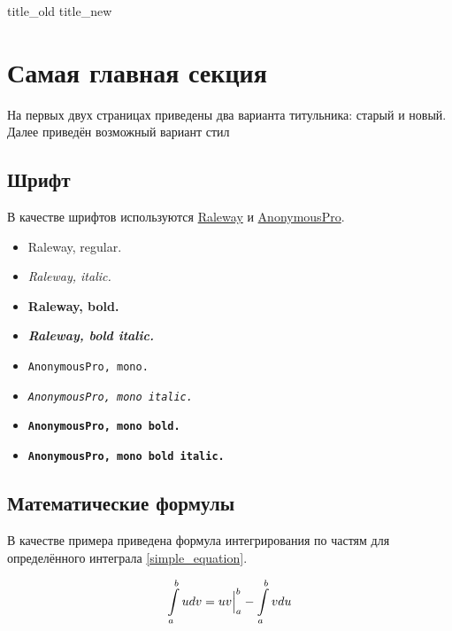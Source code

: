 \documentclass[12pt,a4paper]{article}
\begin{document}
{title_old} %
{title_new} %

\tableofcontents %


\section{Самая главная секция}

На первых двух страницах приведены два варианта титульника: старый и новый. Далее приведён возможный вариант стил


\subsection{Шрифт}

В качестве шрифтов используются \href{https://fonts.google.com/specimen/Raleway}{Raleway} и \href{https://fonts.google.com/specimen/Anonymous+Pro}{AnonymousPro}.

\begin{multicols}{2}
	\begin{itemize}
		\item Raleway, regular.
		\item \textit{Raleway, italic.}
		\item \textbf{Raleway, bold.}
		\item \textbf{\textit{Raleway, bold italic.}}
		\item \texttt{AnonymousPro, mono.}
		\item \textit{\texttt{AnonymousPro, mono italic.}}
		\item \textbf{\texttt{AnonymousPro, mono bold.}}
		\item \textbf{\texttt{AnonymousPro, mono bold italic.}}
	\end{itemize}
\end{multicols}


\subsection{Математические формулы}


В качестве примера приведена формула интегрирования по частям для определённого интеграла \eqref{simple_equation}.

\begin{equation} \label{simple_equation}
\displaystyle\int\limits_a^b u dv = uv \Big|_a^b - \displaystyle\int\limits_a^b v du
\end{equation} 
\end{document}
